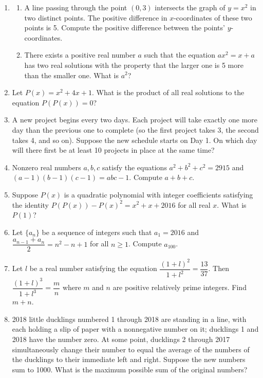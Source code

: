 \documentclass[12pt]{scrartcl}
\begin{document}
\begin{enumerate}
    \item 
    \begin{enumerate}
        \item A line passing through the point $(0,3)$ intersects the graph of $y=x^2$ in two distinct points. The positive difference in $x$-coordinates of these two points is 5. Compute the positive difference between the points' $y$-coordinates.
        \item There exists a positive real number $a$ such that the equation $ax^2 = x+a$ has two real solutions with the property that the larger one is 5 more than the smaller one. What is $a^2$?
    \end{enumerate}

    \item Let $P(x) = x^2+4x+1$. What is the product of all real solutions to the equation $P(P(x))=0$?

    \item A new project begins every two days. Each project will take exactly one more day than the previous one to complete (so the first project takes 3, the second takes 4, and so on). Suppose the new schedule starts on Day 1. On which day will there first be at least 10 projects in place at the same time?

    \item Nonzero real numbers $a, b, c$ satisfy the equations $a^2+b^2+c^2=2915$ and $(a-1)(b-1)(c-1)=abc-1$. Compute $a+b+c$.

    \item Suppose $P(x)$ is a quadratic polynomial with integer coefficients satisfying the identity $P(P(x)) - P(x)^2 = x^2+x+2016$ for all real $x$. What is $P(1)$?

    \item Let $\{a_n\}$ be a sequence of integers such that $a_1=2016$ and $\dfrac{a_{n-1}+a_n}{2} = n^2-n+1$ for all $n \ge 1$. Compute $a_{100}$.

    \item Let $l$ be a real number satisfying the equation $\dfrac{(1+l)^2}{1+l^2} = \dfrac{13}{37}$. Then $\dfrac{(1+l)^3}{1+l^3} = \dfrac{m}{n}$ where $m$ and $n$ are positive relatively prime integers. Find $m+n$.

    \item 2018 little ducklings numbered 1 through 2018 are standing in a line, with each holding a slip of paper with a nonnegative number on it; ducklings 1 and 2018 have the number zero. At some point, ducklings 2 through 2017 simultaneously change their number to equal the average of the numbers of the ducklings to their immediate left and right. Suppose the new numbers sum to 1000. What is the maximum possible sum of the original numbers?


\end{enumerate}
\end{document}
